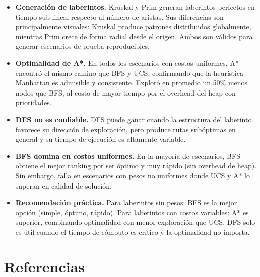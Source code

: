 \documentclass[12pt,a4paper]{article}
\begin{document}
\begin{itemize}[leftmargin=*]

  \item \textbf{Generación de laberintos.}
        Kruskal y Prim generan laberintos perfectos en tiempo
        sub-lineal respecto al número de aristas. Sus diferencias son
        principalmente visuales: Kruskal produce patrones distribuidos
        globalmente, mientras Prim crece de forma radial desde el origen.
        Ambos son válidos para generar escenarios de prueba reproducibles.

  \item \textbf{Optimalidad de A*.}
        En todos los escenarios con costos uniformes, A* encontró el
        mismo camino que BFS y UCS, confirmando que la heurística
        Manhattan es admisible y consistente. Exploró en promedio un
        50\% menos nodos que BFS, al costo de mayor tiempo por el
        overhead del heap con prioridades.

  \item \textbf{DFS no es confiable.}
        DFS puede ganar cuando la estructura del laberinto favorece su
        dirección de exploración, pero produce rutas subóptimas en
        general y su tiempo de ejecución es altamente variable.

  \item \textbf{BFS domina en costos uniformes.}
        En la mayoría de escenarios, BFS obtiene el mejor ranking por
        ser óptimo y muy rápido (sin overhead de heap). Sin embargo,
        falla en escenarios con pesos no uniformes donde UCS y A* lo
        superan en calidad de solución.

  \item \textbf{Recomendación práctica.}
        Para laberintos sin pesos: BFS es la mejor opción (simple,
        óptimo, rápido). Para laberintos con costos variables: A* es
        superior, combinando optimalidad con menor exploración que UCS.
        DFS solo es útil cuando el tiempo de cómputo es crítico y la
        optimalidad no importa.

\end{itemize}

\section*{Referencias}
\end{document}
